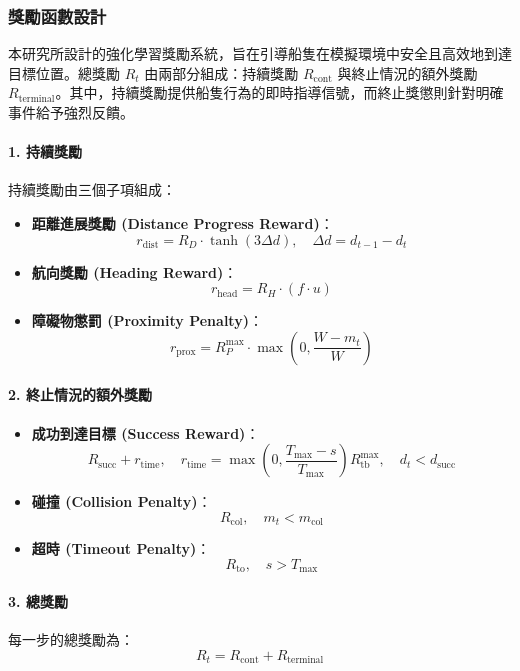 \documentclass[12pt,a4paper]{article}
\begin{document}
\subsubsection{獎勵函數設計}

本研究所設計的強化學習獎勵系統，旨在引導船隻在模擬環境中安全且高效地到達目標位置。總獎勵 $R_t$ 由兩部分組成：持續獎勵 $R_{\text{cont}}$ 與終止情況的額外獎勵 $R_{\text{terminal}}$。其中，持續獎勵提供船隻行為的即時指導信號，而終止獎懲則針對明確事件給予強烈反饋。

\paragraph{1. 持續獎勵}
持續獎勵由三個子項組成：
\begin{itemize}
    \item \textbf{距離進展獎勵 (Distance Progress Reward)}：
    \[
    r_{\text{dist}} = R_D \cdot \tanh(3 \Delta d), \quad \Delta d = d_{t-1}-d_t
    \]
    \item \textbf{航向獎勵 (Heading Reward)}：
    \[
    r_{\text{head}} = R_H \cdot (f \cdot u)
    \]
    \item \textbf{障礙物懲罰 (Proximity Penalty)}：
    \[
    r_{\text{prox}} = R_P^{\max} \cdot \max\!\left(0, \frac{W - m_t}{W}\right)
    \]
\end{itemize}

\paragraph{2. 終止情況的額外獎勵}
\begin{itemize}
    \item \textbf{成功到達目標 (Success Reward)}：
    \[
    R_{\text{succ}} + r_{\text{time}}, \quad
    r_{\text{time}} = \max\!\left(0, \frac{T_{\max}-s}{T_{\max}}\right) R_{\text{tb}}^{\max}, \quad d_t<d_{\text{succ}}
    \]
    \item \textbf{碰撞 (Collision Penalty)}：
    \[
    R_{\text{col}}, \quad m_t < m_{\text{col}}
    \]
    \item \textbf{超時 (Timeout Penalty)}：
    \[
    R_{\text{to}}, \quad s > T_{\max}
    \]
\end{itemize}

\paragraph{3. 總獎勵}
每一步的總獎勵為：
\[
R_t = R_{\text{cont}} + R_{\text{terminal}}
\]
\end{document}
